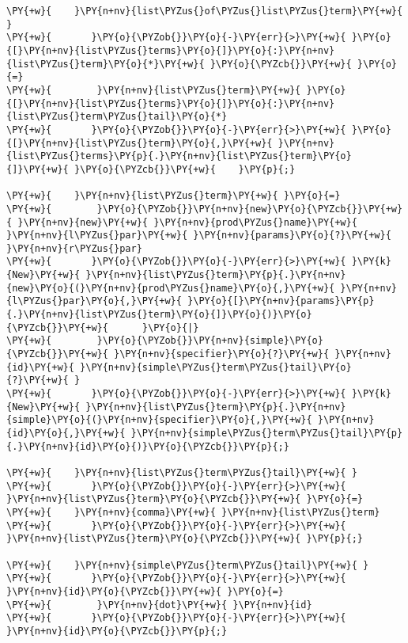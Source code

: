 \begin{Verbatim}[commandchars=\\\{\}]
\PY{+w}{    }\PY{n+nv}{list\PYZus{}of\PYZus{}list\PYZus{}term}\PY{+w}{ }
\PY{+w}{	   }\PY{o}{\PYZob{}}\PY{o}{-}\PY{err}{>}\PY{+w}{ }\PY{o}{[}\PY{n+nv}{list\PYZus{}terms}\PY{o}{]}\PY{o}{:}\PY{n+nv}{list\PYZus{}term}\PY{o}{*}\PY{+w}{ }\PY{o}{\PYZcb{}}\PY{+w}{ }\PY{o}{=}
\PY{+w}{		}\PY{n+nv}{list\PYZus{}term}\PY{+w}{ }\PY{o}{[}\PY{n+nv}{list\PYZus{}terms}\PY{o}{]}\PY{o}{:}\PY{n+nv}{list\PYZus{}term\PYZus{}tail}\PY{o}{*}
\PY{+w}{	   }\PY{o}{\PYZob{}}\PY{o}{-}\PY{err}{>}\PY{+w}{ }\PY{o}{[}\PY{n+nv}{list\PYZus{}term}\PY{o}{,}\PY{+w}{ }\PY{n+nv}{list\PYZus{}terms}\PY{p}{.}\PY{n+nv}{list\PYZus{}term}\PY{o}{]}\PY{+w}{ }\PY{o}{\PYZcb{}}\PY{+w}{    }\PY{p}{;}

\PY{+w}{    }\PY{n+nv}{list\PYZus{}term}\PY{+w}{ }\PY{o}{=}
\PY{+w}{        }\PY{o}{\PYZob{}}\PY{n+nv}{new}\PY{o}{\PYZcb{}}\PY{+w}{ }\PY{n+nv}{new}\PY{+w}{ }\PY{n+nv}{prod\PYZus{}name}\PY{+w}{ }\PY{n+nv}{l\PYZus{}par}\PY{+w}{ }\PY{n+nv}{params}\PY{o}{?}\PY{+w}{ }\PY{n+nv}{r\PYZus{}par}
\PY{+w}{	   }\PY{o}{\PYZob{}}\PY{o}{-}\PY{err}{>}\PY{+w}{ }\PY{k}{New}\PY{+w}{ }\PY{n+nv}{list\PYZus{}term}\PY{p}{.}\PY{n+nv}{new}\PY{o}{(}\PY{n+nv}{prod\PYZus{}name}\PY{o}{,}\PY{+w}{ }\PY{n+nv}{l\PYZus{}par}\PY{o}{,}\PY{+w}{ }\PY{o}{[}\PY{n+nv}{params}\PY{p}{.}\PY{n+nv}{list\PYZus{}term}\PY{o}{]}\PY{o}{)}\PY{o}{\PYZcb{}}\PY{+w}{		}\PY{o}{|}
\PY{+w}{       	}\PY{o}{\PYZob{}}\PY{n+nv}{simple}\PY{o}{\PYZcb{}}\PY{+w}{ }\PY{n+nv}{specifier}\PY{o}{?}\PY{+w}{ }\PY{n+nv}{id}\PY{+w}{ }\PY{n+nv}{simple\PYZus{}term\PYZus{}tail}\PY{o}{?}\PY{+w}{ }
\PY{+w}{	   }\PY{o}{\PYZob{}}\PY{o}{-}\PY{err}{>}\PY{+w}{ }\PY{k}{New}\PY{+w}{ }\PY{n+nv}{list\PYZus{}term}\PY{p}{.}\PY{n+nv}{simple}\PY{o}{(}\PY{n+nv}{specifier}\PY{o}{,}\PY{+w}{ }\PY{n+nv}{id}\PY{o}{,}\PY{+w}{ }\PY{n+nv}{simple\PYZus{}term\PYZus{}tail}\PY{p}{.}\PY{n+nv}{id}\PY{o}{)}\PY{o}{\PYZcb{}}\PY{p}{;}

\PY{+w}{    }\PY{n+nv}{list\PYZus{}term\PYZus{}tail}\PY{+w}{ }
\PY{+w}{	   }\PY{o}{\PYZob{}}\PY{o}{-}\PY{err}{>}\PY{+w}{ }\PY{n+nv}{list\PYZus{}term}\PY{o}{\PYZcb{}}\PY{+w}{ }\PY{o}{=}
\PY{+w}{	}\PY{n+nv}{comma}\PY{+w}{ }\PY{n+nv}{list\PYZus{}term}
\PY{+w}{	   }\PY{o}{\PYZob{}}\PY{o}{-}\PY{err}{>}\PY{+w}{ }\PY{n+nv}{list\PYZus{}term}\PY{o}{\PYZcb{}}\PY{+w}{ }\PY{p}{;}

\PY{+w}{    }\PY{n+nv}{simple\PYZus{}term\PYZus{}tail}\PY{+w}{ }
\PY{+w}{	   }\PY{o}{\PYZob{}}\PY{o}{-}\PY{err}{>}\PY{+w}{ }\PY{n+nv}{id}\PY{o}{\PYZcb{}}\PY{+w}{ }\PY{o}{=}
\PY{+w}{        }\PY{n+nv}{dot}\PY{+w}{ }\PY{n+nv}{id}
\PY{+w}{	   }\PY{o}{\PYZob{}}\PY{o}{-}\PY{err}{>}\PY{+w}{ }\PY{n+nv}{id}\PY{o}{\PYZcb{}}\PY{p}{;}


\end{Verbatim}
